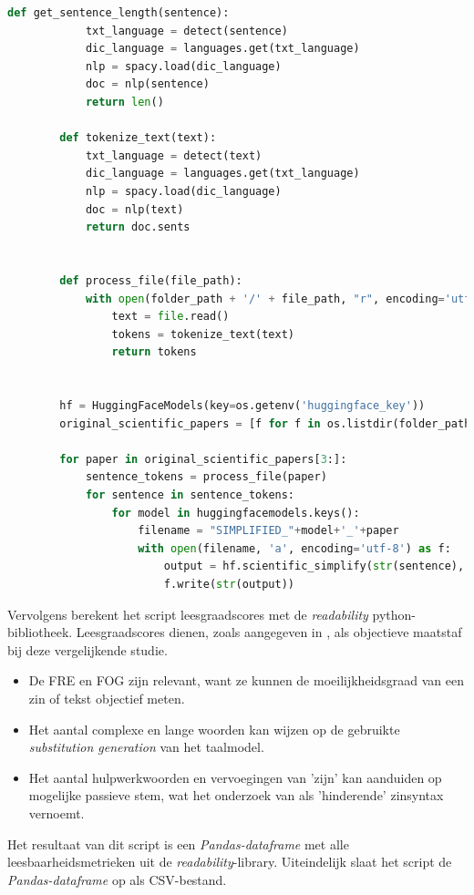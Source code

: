 \begin{center}
\begin{lstlisting}[language=Python, caption={Script voor de derde fase van de vergelijkende studie}, label={code:verg-studie-phase-3}]
		def get_sentence_length(sentence):
			txt_language = detect(sentence)
			dic_language = languages.get(txt_language)
			nlp = spacy.load(dic_language)
			doc = nlp(sentence)
			return len()	
		
		def tokenize_text(text):
			txt_language = detect(text)
			dic_language = languages.get(txt_language)
			nlp = spacy.load(dic_language)
			doc = nlp(text)
			return doc.sents
			
		
		def process_file(file_path):
			with open(folder_path + '/' + file_path, "r", encoding='utf8') as file:
				text = file.read()
				tokens = tokenize_text(text)
				return tokens
				
		
		hf = HuggingFaceModels(key=os.getenv('huggingface_key'))
		original_scientific_papers = [f for f in os.listdir(folder_path)]
		
		for paper in original_scientific_papers[3:]:
			sentence_tokens = process_file(paper) 
			for sentence in sentence_tokens:
				for model in huggingfacemodels.keys():
					filename = "SIMPLIFIED_"+model+'_'+paper
					with open(filename, 'a', encoding='utf-8') as f:
						output = hf.scientific_simplify(str(sentence), model)
						f.write(str(output)) 	
	\end{lstlisting}
\end{center}

Vervolgens berekent het script leesgraadscores met de \textit{readability} python-bibliotheek. Leesgraadscores dienen, zoals aangegeven in \textcite{Nenkova2004}, als objectieve maatstaf bij deze vergelijkende studie. 

\begin{itemize}
	\item De FRE en FOG zijn relevant, want ze kunnen de moeilijkheidsgraad van een zin of tekst objectief meten.
	\item Het aantal complexe en lange woorden kan wijzen op de gebruikte \textit{substitution generation} van het taalmodel.
	\item Het aantal hulpwerkwoorden en vervoegingen van 'zijn' kan aanduiden op mogelijke passieve stem, wat het onderzoek van \textcite{Ruelas2020} als 'hinderende' zinsyntax vernoemt.
\end{itemize}

Het resultaat van dit script is een \textit{Pandas-dataframe} met alle leesbaarheidsmetrieken uit de \textit{readability}-library. Uiteindelijk slaat het script de \textit{Pandas-dataframe} op als CSV-bestand.

\medspace

